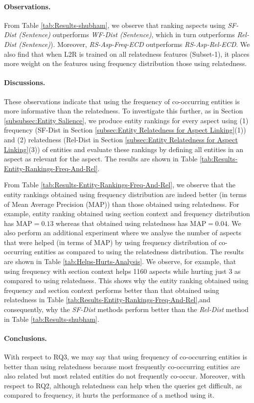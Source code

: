\paragraph{\textbf{Observations.}}
From Table \ref{tab:Results-shubham}, we observe that ranking aspects using \textit{SF-Dist (Sentence)} outperforms \textit{WF-Dist (Sentence)}, which in turn outperforms \textit{Rel-Dist (Sentence)}). Moreover, \textit{RS-Asp-Freq-ECD} outperforms \textit{RS-Asp-Rel-ECD}. We also find that when L2R is trained on all relatedness features (Subset-1), it places more weight on the features using frequency distribution those using relatedness. 

\paragraph{\textbf{Discussions.}}
These observations indicate that using the frequency of co-occurring entities is more informative than the relatedness. To investigate this further, as in Section \ref{subsubsec:Entity Salience}, we produce entity rankings for every aspect using (1) frequency (SF-Dist in Section \ref{subsec:Entity Relatedness for Aspect Linking}(1)) and (2) relatedness (Rel-Dist in Section \ref{subsec:Entity Relatedness for Aspect Linking}(3)) of entities and evaluate these rankings by defining all entities in an aspect as relevant for the aspect. The results are shown in Table \ref{tab:Results-Entity-Rankings-Freq-And-Rel}.

From Table \ref{tab:Results-Entity-Rankings-Freq-And-Rel}, we observe that the entity rankings obtained using frequency distribution are indeed better (in terms of Mean Average Precision (MAP)) than those obtained using relatedness. For example, entity ranking obtained using section context and frequency distribution has $\text{MAP}=0.13$ whereas that obtained using relatedness has $\text{MAP}=0.04$. We also perform an additional experiment where we analyse the number of aspects that were helped (in terms of MAP) by using frequency distribution of co-occurring entities as compared to using the relatedness distribution. The results are shown in Table \ref{tab:Helps-Hurts-Analysis}. We observe, for example, that using frequency with section context helps 1160 aspects while hurting just 3 as compared to using relatedness. This shows why the entity ranking obtained using frequency and section context performs better than that obtained using relatedness in Table \ref{tab:Results-Entity-Rankings-Freq-And-Rel},and consequently, why the \textit{SF-Dist} methods perform better than the \textit{Rel-Dist} method in Table \ref{tab:Results-shubham}.

\paragraph{\textbf{Conclusions.}}
With respect to RQ3, we may say that using frequency of co-occurring entities is better than using relatedness because most frequently co-occurring entities are also related but most related entities do not frequently co-occur. Moreover, with respect to RQ2, although relatedness can help when the queries get difficult, as compared to frequency, it hurts the performance of a method using it.

